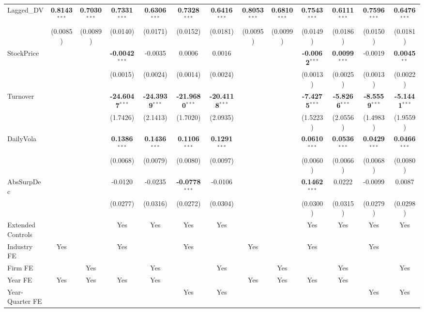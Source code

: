 \documentclass[11pt,a4paper]{article}
\begin{document}
\begin{table}[htbp]
\begin{tabular}{lcccccccccccc}
Lagged\_DV & \textbf{0.8143}$^{***}$ & \textbf{0.7030}$^{***}$ & \textbf{0.7331}$^{***}$ & \textbf{0.6306}$^{***}$ & \textbf{0.7328}$^{***}$ & \textbf{0.6416}$^{***}$ & \textbf{0.8053}$^{***}$ & \textbf{0.6810}$^{***}$ & \textbf{0.7543}$^{***}$ & \textbf{0.6111}$^{***}$ & \textbf{0.7596}$^{***}$ & \textbf{0.6476}$^{***}$ \\
 & (0.0085) & (0.0089) & (0.0140) & (0.0171) & (0.0152) & (0.0181) & (0.0095) & (0.0099) & (0.0149) & (0.0186) & (0.0150) & (0.0181) \\
StockPrice &  &  & \textbf{-0.0042}$^{***}$ & -0.0035 & 0.0006 & 0.0016 &  &  & \textbf{-0.0062}$^{***}$ & \textbf{0.0099}$^{***}$ & -0.0019 & \textbf{0.0045}$^{**}$ \\
 &  &  & (0.0015) & (0.0024) & (0.0014) & (0.0024) &  &  & (0.0013) & (0.0025) & (0.0013) & (0.0022) \\
Turnover &  &  & \textbf{-24.6047}$^{***}$ & \textbf{-24.3939}$^{***}$ & \textbf{-21.9680}$^{***}$ & \textbf{-20.4118}$^{***}$ &  &  & \textbf{-7.4275}$^{***}$ & \textbf{-5.8266}$^{***}$ & \textbf{-8.5559}$^{***}$ & \textbf{-5.1441}$^{***}$ \\
 &  &  & (1.7426) & (2.1413) & (1.7020) & (2.0935) &  &  & (1.5223) & (2.0556) & (1.4983) & (1.9559) \\
DailyVola &  &  & \textbf{0.1386}$^{***}$ & \textbf{0.1436}$^{***}$ & \textbf{0.1106}$^{***}$ & \textbf{0.1291}$^{***}$ &  &  & \textbf{0.0610}$^{***}$ & \textbf{0.0536}$^{***}$ & \textbf{0.0429}$^{***}$ & \textbf{0.0466}$^{***}$ \\
 &  &  & (0.0068) & (0.0079) & (0.0080) & (0.0097) &  &  & (0.0060) & (0.0066) & (0.0068) & (0.0080) \\
AbsSurpDec &  &  & -0.0120 & -0.0235 & \textbf{-0.0778}$^{***}$ & -0.0106 &  &  & \textbf{0.1462}$^{***}$ & 0.0222 & -0.0099 & 0.0087 \\
 &  &  & (0.0277) & (0.0316) & (0.0272) & (0.0304) &  &  & (0.0300) & (0.0315) & (0.0279) & (0.0298) \\
\midrule
Extended Controls &  &  & Yes & Yes & Yes & Yes &  &  & Yes & Yes & Yes & Yes \\
Industry FE & Yes &  & Yes &  & Yes &  & Yes &  & Yes &  & Yes &  \\
Firm FE &  & Yes &  & Yes &  & Yes &  & Yes &  & Yes &  & Yes \\
Year FE & Yes & Yes & Yes & Yes &  &  & Yes & Yes & Yes & Yes &  &  \\
Year-Quarter FE &  &  &  &  & Yes & Yes &  &  &  &  & Yes & Yes \\

\end{tabular}
\end{table}
\end{document}
